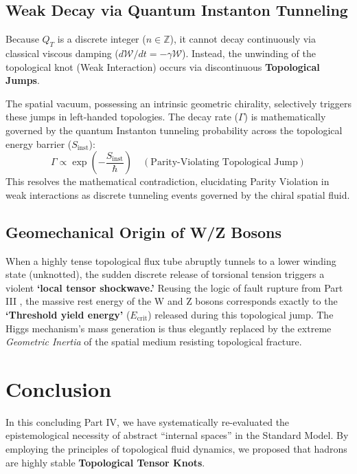 \documentclass[reprint,amsmath,amssymb,aps,prd]{revtex4-2}
\begin{document}
\subsection{Weak Decay via Quantum Instanton Tunneling}
Because $Q_T$ is a discrete integer ($n \in \mathbb{Z}$), it cannot decay continuously via classical viscous damping ($d\mathcal{W}/dt = -\gamma \mathcal{W}$). Instead, the unwinding of the topological knot (Weak Interaction) occurs via discontinuous \textbf{Topological Jumps}.

The spatial vacuum, possessing an intrinsic geometric chirality, selectively triggers these jumps in left-handed topologies. The decay rate ($\Gamma$) is mathematically governed by the quantum Instanton tunneling probability across the topological energy barrier ($S_{\mathrm{inst}}$):
\begin{equation}
\Gamma \propto \exp\left( -\frac{S_{\mathrm{inst}}}{\hbar} \right) \quad (\text{Parity-Violating Topological Jump})
\end{equation}
This resolves the mathematical contradiction, elucidating Parity Violation in weak interactions \cite{Wu1957} as discrete tunneling events governed by the chiral spatial fluid.

\subsection{Geomechanical Origin of W/Z Bosons}
When a highly tense topological flux tube abruptly tunnels to a lower winding state (unknotted), the sudden discrete release of torsional tension triggers a violent \textbf{`local tensor shockwave.'} Reusing the logic of fault rupture from Part III \cite{YooPart3}, the massive rest energy of the W and Z bosons corresponds exactly to the \textbf{`Threshold yield energy'} ($E_{\mathrm{crit}}$) released during this topological jump. The Higgs mechanism's mass generation \cite{Higgs1964} is thus elegantly replaced by the extreme \textit{Geometric Inertia} of the spatial medium resisting topological fracture.

\section{Conclusion}

In this concluding Part IV, we have systematically re-evaluated the epistemological necessity of abstract ``internal spaces'' in the Standard Model. By employing the principles of topological fluid dynamics, we proposed that hadrons are highly stable \textbf{Topological Tensor Knots}.
\end{document}
